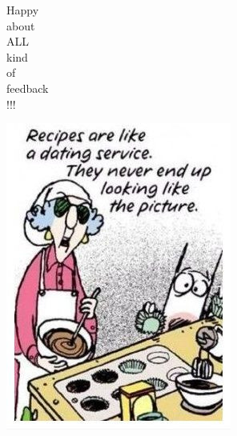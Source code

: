\documentclass[12pt]{beamer}
\begin{document}
	
\begin{frame}
	\begin{minipage}{0.2\textwidth}
		\begin{center} \Large
			Happy\\
			about\\
			ALL\\
			kind\\
			of\\
			feedback\\
			!!!
		\end{center}			
	\end{minipage}
	\begin{minipage}{0.65\textwidth}
		\hspace{2cm}\includegraphics[scale=0.7]{Images/Recipes-are-like-a-dating-service}
	\end{minipage}
\end{frame}
\end{document}
